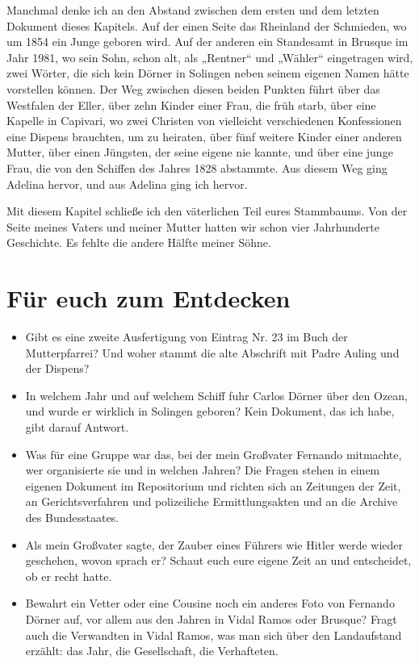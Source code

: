 \documentclass[
  ngerman,
  11pt,
  openany]{book}
\providecommand{\tightlist}{%
  \setlength{\itemsep}{0pt}\setlength{\parskip}{0pt}}
\begin{document}
Manchmal denke ich an den Abstand zwischen dem ersten und dem letzten
Dokument dieses Kapitels. Auf der einen Seite das Rheinland der
Schmieden, wo um 1854 ein Junge geboren wird. Auf der anderen ein
Standesamt in Brusque im Jahr 1981, wo sein Sohn, schon alt, als
„Rentner`` und „Wähler`` eingetragen wird, zwei Wörter, die sich kein
Dörner in Solingen neben seinem eigenen Namen hätte vorstellen können.
Der Weg zwischen diesen beiden Punkten führt über das Westfalen der
Eller, über zehn Kinder einer Frau, die früh starb, über eine Kapelle in
Capivari, wo zwei Christen von vielleicht verschiedenen Konfessionen
eine Dispens brauchten, um zu heiraten, über fünf weitere Kinder einer
anderen Mutter, über einen Jüngsten, der seine eigene nie kannte, und
über eine junge Frau, die von den Schiffen des Jahres 1828 abstammte.
Aus diesem Weg ging Adelina hervor, und aus Adelina ging ich hervor.

Mit diesem Kapitel schließe ich den väterlichen Teil eures Stammbaums.
Von der Seite meines Vaters und meiner Mutter hatten wir schon vier
Jahrhunderte Geschichte. Es fehlte die andere Hälfte meiner Söhne.

\section{Für euch zum Entdecken}\label{fuxfcr-euch-zum-entdecken-9}

\begin{itemize}
\tightlist
\item
  Gibt es eine zweite Ausfertigung von Eintrag Nr. 23 im Buch der
  Mutterpfarrei? Und woher stammt die alte Abschrift mit Padre Auling
  und der Dispens?
\item
  In welchem Jahr und auf welchem Schiff fuhr Carlos Dörner über den
  Ozean, und wurde er wirklich in Solingen geboren? Kein Dokument, das
  ich habe, gibt darauf Antwort.
\item
  Was für eine Gruppe war das, bei der mein Großvater Fernando
  mitmachte, wer organisierte sie und in welchen Jahren? Die Fragen
  stehen in einem eigenen Dokument im Repositorium und richten sich an
  Zeitungen der Zeit, an Gerichtsverfahren und polizeiliche
  Ermittlungsakten und an die Archive des Bundesstaates.
\item
  Als mein Großvater sagte, der Zauber eines Führers wie Hitler werde
  wieder geschehen, wovon sprach er? Schaut euch eure eigene Zeit an und
  entscheidet, ob er recht hatte.
\item
  Bewahrt ein Vetter oder eine Cousine noch ein anderes Foto von
  Fernando Dörner auf, vor allem aus den Jahren in Vidal Ramos oder
  Brusque? Fragt auch die Verwandten in Vidal Ramos, was man sich über
  den Landaufstand erzählt: das Jahr, die Gesellschaft, die Verhafteten.
\end{itemize}
\end{document}
